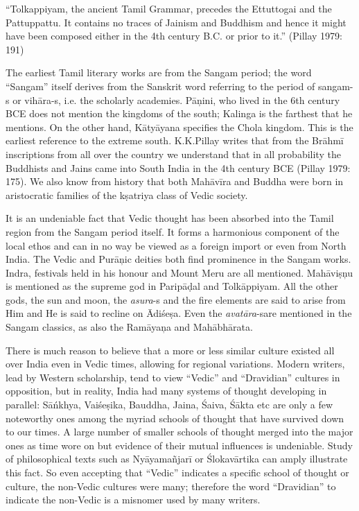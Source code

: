 \begin{myquote}
“Tolkappiyam, the ancient Tamil Grammar, precedes the Ettuttogai and the Pattuppattu. It contains no traces of Jainism and Buddhism and hence it might have been composed either in the 4th century B.C. or prior to it.” (Pillay 1979: 191)
\end{myquote}

The earliest Tamil literary works are from the Sangam period; the word “Sangam” itself derives from the Sanskrit word referring to the period of sangam-s or vihāra-s, i.e. the scholarly academies. Pāņini, who lived in the 6th century BCE does not mention the kingdoms of the south; Kalinga is the farthest that he mentions. On the other hand, Kātyāyana specifies the Chola kingdom. This is the earliest reference to the extreme south. K.K.Pillay writes that from the Brāhmī inscriptions from all over the country we understand that in all probability the Buddhists and Jains came into South India in the 4th century BCE (Pillay 1979: 175). We also know from history that both Mahāvīra and Buddha were born in aristocratic families of the kṣatriya class of Vedic society.

It is an undeniable fact that Vedic thought has been absorbed into the Tamil region from the Sangam period itself. It forms a harmonious component of the local ethos and can in no way be viewed as a foreign import or even from North India. The Vedic and Purāņic deities both find prominence in the Sangam works. Indra, festivals held in his honour and Mount Meru are all mentioned. Mahāviṣņu is mentioned as the supreme god in Paripāḍal and Tolkāppiyam. All the other gods, the sun and moon, the \textit{asura}-s and the fire elements are said to arise from Him and He is said to recline on Ādiśeṣa. Even the \textit{avatāra}-s\break are mentioned in the Sangam classics, as also the Ramāyaņa and Mahābhārata.

There is much reason to believe that a more or less similar culture existed all over India even in Vedic times, allowing for regional variations. Modern writers, lead by Western scholarship, tend to view “Vedic” and “Dravidian” cultures in opposition, but in reality, India had many systems of thought developing in parallel: Sāńkhya, Vaiśeṣika, Bauddha, Jaina, Śaiva, Śākta etc are only a few noteworthy ones among the myriad schools of thought that have survived down to our times. A large number of smaller schools of thought merged into the major ones as time wore on but evidence of their mutual influences is undeniable. Study of philosophical texts such as Nyāyamañjarī or Ślokavārtika can amply illustrate this fact. So even accepting that “Vedic” indicates a specific school of thought or culture, the non-Vedic cultures were many; therefore the word “Dravidian” to indicate the non-Vedic is a misnomer used by many writers.

